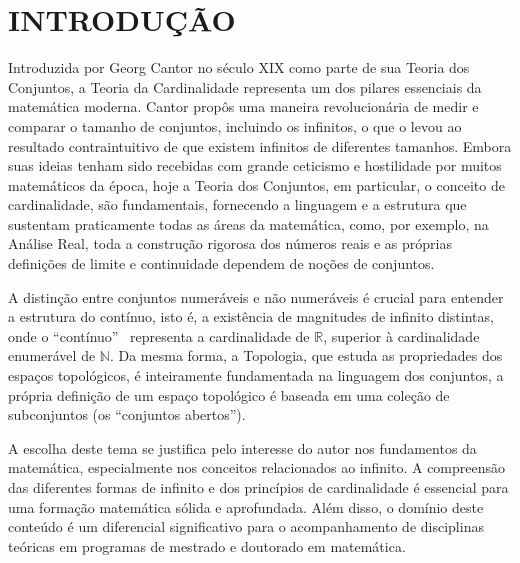 
\chapter{INTRODUÇÃO}
\label{chap:introducao}

Introduzida por Georg Cantor no século XIX como parte de sua Teoria dos Conjuntos, a Teoria da Cardinalidade representa um dos pilares essenciais da matemática moderna. Cantor propôs uma maneira revolucionária de medir e comparar o tamanho de conjuntos, incluindo os infinitos, o que o levou ao resultado contraintuitivo de que existem infinitos de diferentes tamanhos. Embora suas ideias tenham sido recebidas com grande ceticismo e hostilidade por muitos matemáticos da época, hoje a Teoria dos Conjuntos, em particular, o conceito de cardinalidade, são fundamentais, fornecendo a linguagem e a estrutura que sustentam praticamente todas as áreas da matemática, como, por exemplo, na Análise Real, toda a construção rigorosa dos números reais e as próprias definições de limite e continuidade dependem de noções de conjuntos.

A distinção entre conjuntos numeráveis e não numeráveis é crucial para entender a estrutura do contínuo, isto é, a existência de magnitudes de infinito distintas, onde o ``contínuo'' \ representa a cardinalidade de \(\mathbb{R}\), superior à cardinalidade enumerável de \(\mathbb{N}\). Da mesma forma, a Topologia, que estuda as propriedades dos espaços topológicos, é inteiramente fundamentada na linguagem dos conjuntos, a própria definição de um espaço topológico é baseada em uma coleção de subconjuntos (os ``conjuntos abertos'').

A escolha deste tema se justifica pelo interesse do autor nos fundamentos da matemática, especialmente nos conceitos relacionados ao infinito. A compreensão das diferentes formas de infinito e dos princípios de cardinalidade é essencial para uma formação matemática sólida e aprofundada. Além disso, o domínio deste conteúdo é um diferencial significativo para o acompanhamento de disciplinas teóricas em programas de mestrado e doutorado em matemática.


